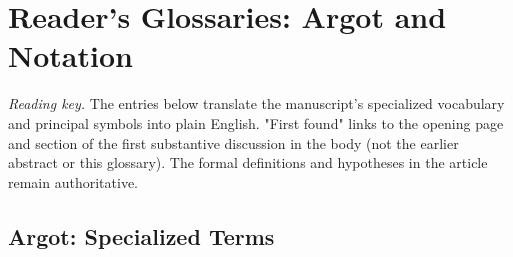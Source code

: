 \documentclass[11pt,letterpaper]{article}
\begin{document}
\section*{Reader's Glossaries: Argot and Notation}
\noindent\emph{Reading key.} The entries below translate the manuscript's specialized vocabulary and principal symbols into plain English. "First found" links to the opening page and section of the first substantive discussion in the body (not the earlier abstract or this glossary). The formal definitions and hypotheses in the article remain authoritative.
\subsection*{Argot: Specialized Terms}
\begingroup\small\setlength{\tabcolsep}{4pt}\renewcommand{\arraystretch}{1.16}
\end{document}
